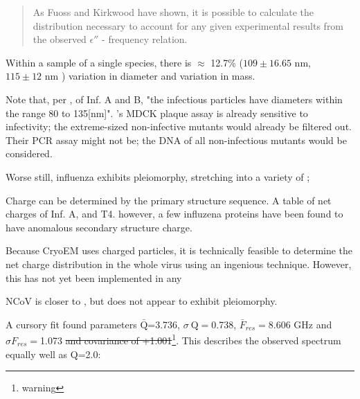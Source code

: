 \documentclass[paper.tex]{subfiles}
\begin{document}
\begin{quote}
	As Fuoss and Kirkwood have shown, it is possible to calculate the distribution necessary to account for any given experimental results from the observed $\epsilon''$ - frequency relation.
\end{quote}

Within a sample of a single species, there is $\approx$ 12.7\%  ($109 \pm 16.65 \text{ nm}$\cite{lauffer1944biophysical}, $115 \pm 12 \text{ nm}$ \cite{Characterization1984}) variation in diameter and  \cite{Characterization1984} variation in mass.



Note that, per \cite{lauffer1944biophysical}, of Inf. A and B, "the infectious particles have diameters within the range 80 to 135[nm]". \cite{Efficient2015}'s MDCK plaque assay is already sensitive to infectivity; the extreme-sized non-infective mutants would already be filtered out. Their PCR assay might not be; the DNA of all non-infectious mutants would be considered.


Worse still, influenza exhibits pleiomorphy, stretching into a variety of \cite{Influenza2006}; 

Charge can be determined by the primary structure sequence. A table of net charges of Inf. A, and T4. however, a few influzena proteins have been found to have anomalous secondary structure charge.



Because CryoEM uses charged particles, it is technically feasible to determine the net charge distribution in the whole virus using an ingenious \cite{Identification2018} technique. However, this has not yet been implemented in any


\footnotemark


NCoV is closer to \cite{Viral2020}, but does not appear to exhibit pleiomorphy.

A cursory fit found parameters $\bar{\text{Q}}$=3.736,  $\sigma \ \text{Q} = $0.738, $\bar{F}_{res}=$8.606 GHz and $\sigma {F_{res}}=$1.073 \st{and covariance of +1.001}\footnote{warning}. This describes the observed spectrum equally well as Q=2.0:
\end{document}
